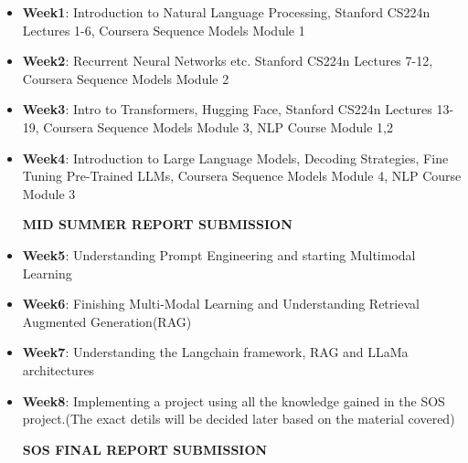 \documentclass{article}
\begin{document}
\begin{itemize}
    \Large
    \item \textbf{\Large Week1}: Introduction to Natural Language Processing, Stanford CS224n Lectures 1-6, Coursera Sequence Models Module 1
    \vspace{0.3cm}
    \item \textbf{\Large Week2}: Recurrent Neural Networks etc. Stanford CS224n Lectures 7-12, Coursera Sequence Models Module 2
    \vspace{0.3cm}
    \item \textbf{\Large Week3}: Intro to Transformers, Hugging Face, Stanford CS224n Lectures 13-19, Coursera Sequence Models Module 3, NLP Course Module 1,2
    \vspace{0.3cm}
    \item \textbf{\Large Week4}: Introduction to Large Language Models, Decoding Strategies, Fine Tuning Pre-Trained LLMs, Coursera Sequence Models Module 4, NLP Course Module 3
    
    \begin{center}
        \textbf{\Large MID SUMMER REPORT SUBMISSION}
    \end{center}
    
    \item \textbf{\Large Week5}: Understanding Prompt Engineering and starting Multimodal Learning
    \vspace{0.3cm}
    \item \textbf{\Large Week6}: Finishing Multi-Modal Learning and Understanding Retrieval Augmented Generation(RAG)
    \vspace{0.3cm}
    \item \textbf{\Large Week7}: Understanding the Langchain framework, RAG and LLaMa architectures
    \vspace{0.3cm}
    \item \textbf{\Large Week8}: Implementing a project using all the knowledge gained in the SOS project.(The exact detils will be decided later based on the material covered)
    \vspace{0.4cm}
    
    \begin{center}
        \textbf{\Large SOS FINAL REPORT SUBMISSION}
    \end{center}
\end{itemize}
\end{document}
